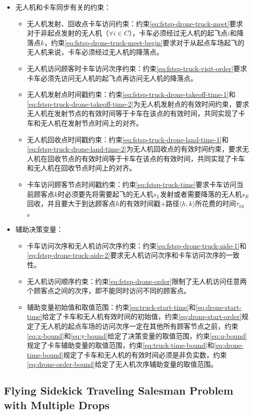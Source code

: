 \begin{itemize}
\begin{itemize}
    \end{itemize}
    \item \colorbox{shallow-yellow}{无人机和卡车同步有关的约束：}
    \begin{itemize}
        \item 无人机发射、回收点卡车访问约束：约束\ref{eq:fstsp-drone-truck-meet}要求对于非起点发射的无人机（$\forall i \in C$），卡车必须经过无人机的起飞点$i$和降落点$k$，约束\ref{eq:fstsp-drone-truck-meet-begin}要求对于从起点车场起飞的无人机来说，卡车必须经过无人机的降落点。
        \item 无人机访问顾客时卡车访问次序约束：约束\ref{eq:fstsp-truck-visit-order}要求卡车必须先访问无人机的起飞点再访问无人机的降落点。
        \item 无人机发射点时间戳约束：约束\ref{eq:fstsp-truck-drone-takeoff-time-1}和\ref{eq:fstsp-truck-drone-takeoff-time-2}为无人机发射点的有效时间约束，要求无人机在发射节点的有效时间等于卡车在该点的有效时间，共同实现了卡车和无人机在发射节点时间上的对齐。
        \item 无人机回收点时间戳约束：约束\ref{eq:fstsp-truck-drone-land-time-1}和\ref{eq:fstsp-truck-drone-land-time-2}为无人机回收点的有效时间约束，要求无人机在回收节点的有效时间等于卡车在该点的有效时间，共同实现了卡车和无人机在回收节点时间上的对齐。
        \item 卡车访问顾客节点时间戳约束：约束\ref{eq:fstsp-truck-time}要求卡车访问当前顾客点$k$时必须要先将需要起飞的无人机$s_L$发射或者需要降落的无人机$s_R$回收，并且要大于到达顾客点$h$的有效时间戳+路径$\langle h,k \rangle$所花费的时间$\tau_{hk}$。
    \end{itemize}
    \item 辅助决策变量：
    \begin{itemize}
        \item 卡车访问次序和无人机访问次序约束：约束\ref{eq:fstsp-drone-truck-aide-1}和\ref{eq:fstsp-drone-truck-aide-2}要求无人机访问次序和卡车访问次序的一致性。
        \item 无人机访问顺序约束：约束\ref{eq:fstsp-drone-order}限制了无人机访问任意两个顾客点之间的次序，即不能同时访问不同的顾客点。
        \item 辅助变量初始值和取值范围：约束\ref{eq:truck-start-time}和\ref{eq:drone-start-time}给定了卡车和无人机有效时间的初始值，约束\ref{eq:drone-start-order}规定了无人机的起点车场的访问次序一定在其他所有顾客节点之前，约束\ref{eq:x-bound}和\ref{eq:y-bound}给定了决策变量的取值范围，约束\ref{eq:u-bound}规定了卡车辅助变量的取值范围，约束\ref{eq:truck-time-bound}和\ref{eq:drone-time-bound}规定了卡车和无人机的有效时间必须是非负实数，约束\ref{eq:drone-order-bound}给定了无人机次序辅助变量的取值范围。
    \end{itemize}
\end{itemize}


\subsection{Flying Sidekick Traveling Salesman Problem with Multiple Drops}
